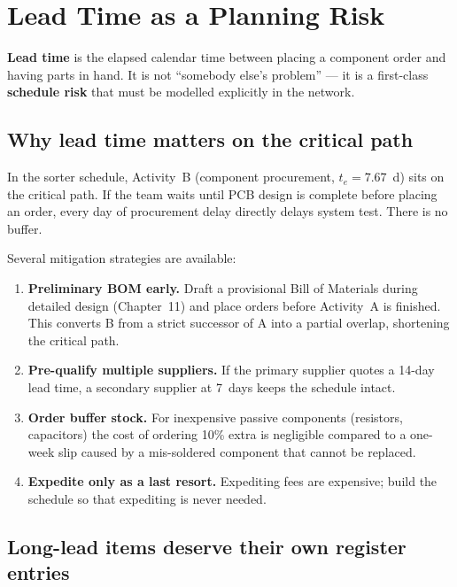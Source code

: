 \section{Lead Time as a Planning Risk}
\label{sec:leadtime}

\textbf{Lead time} is the elapsed calendar time
between placing a component order and having parts in hand.
It is not ``somebody else's problem'' — it is a first-class
\textbf{schedule risk} that must be modelled
explicitly in the network.

\subsection{Why lead time matters on the critical path}

In the sorter schedule, Activity~B (component procurement, $t_e = 7.67$~d)
sits on the critical path.
If the team waits until PCB design is complete before placing an order,
every day of procurement delay directly delays system test.
There is no buffer.

Several mitigation strategies are available:

\begin{enumerate}
  \item \textbf{Preliminary BOM early.}
        Draft a provisional Bill of Materials during detailed design
        (Chapter~11) and place orders before Activity~A is finished.
        This converts B from a strict successor of A into a partial
        overlap, shortening the critical path.
  \item \textbf{Pre-qualify multiple suppliers.}
        If the primary supplier quotes a 14-day lead time, a secondary
        supplier at 7~days keeps the schedule intact.
  \item \textbf{Order buffer stock.}
        For inexpensive passive components (resistors, capacitors)
        the cost of ordering 10\% extra is negligible compared to a
        one-week slip caused by a mis-soldered component that cannot
        be replaced.
  \item \textbf{Expedite only as a last resort.}
        Expediting fees are expensive; build the schedule so that
        expediting is never needed.
\end{enumerate}

\subsection{Long-lead items deserve their own register entries}

